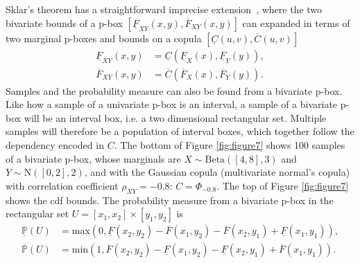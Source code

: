 \documentclass{juliacon}
\begin{document}
Sklar's theorem has a straightforward imprecise extension~\cite{montes2015sklar}, where the two bivariate bounds of a p-box $[\underline{F}_{XY}(x,y), \overline{F}_{XY}(x,y)]$ can expanded in terms of two marginal p-boxes and bounds on a copula $[\underline{C}(u,v), \overline{C}(u,v)]$
\begin{align*}
  \underline{F}_{XY}(x,y) &= \underline{C}(\underline{F}_{X}(x), \underline{F}_{Y}(y)), \\ 
  \overline{F}_{XY}(x,y) &= \overline{C}(\overline{F}_{X}(x), \overline{F}_{Y}(y)).
\end{align*}
Samples and the probability measure can also be found from a bivariate p-box. Like how a sample of a univariate p-box is an interval, a sample of a bivariate p-box will be an interval box, i.e. a two dimensional rectangular set. Multiple samples will therefore be a population of interval boxes, which together follow the dependency encoded in $C$. The bottom of Figure \ref{fig:figure7} shows 100 samples of a bivariate p-box, whose marginals are $X \sim \text{Beta}([4,8], 3)$ and $Y \sim \text{N}([0,2], 2)$, and with the Gaussian copula (multivariate normal's copula) with correlation coefficient $\rho_{XY} = -0.8$: $C = \Phi_{-0.8}$. The top of Figure \ref{fig:figure7} shows the cdf bounds. The probability measure from a bivariate p-box in the rectangular set $ U = [x_{1}, x_{2}] \times [y_{1}, y_{2}]$ is
\begin{align*}
  \underline{\mathbb{P}}(U) &= \text{max}(0, \underline{F}(x_{2}, y_{2}) - \overline{F}(x_{1}, y_{2}) - \overline{F}(x_{2}, y_{1}) + \underline{F}(x_{1}, y_{1})) ,\\ 
  \overline{\mathbb{P}}(U)  &= \text{min}(1, \overline{F}(x_{2}, y_{2}) - \underline{F}(x_{1}, y_{2}) - \underline{F}(x_{2}, y_{1}) + \overline{F}(x_{1}, y_{1}) ).
\end{align*}
\end{document}
